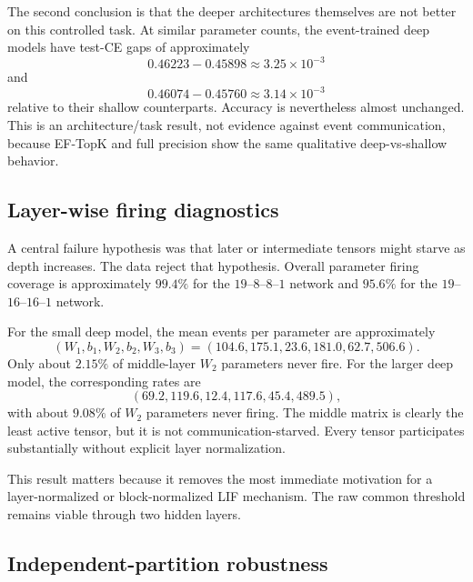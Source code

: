 The second conclusion is that the deeper architectures themselves are not better on this controlled task. At similar parameter counts, the event-trained deep models have test-CE gaps of approximately
\begin{equation}
 0.46223-0.45898\approx3.25\times10^{-3}
\end{equation}
and
\begin{equation}
 0.46074-0.45760\approx3.14\times10^{-3}
\end{equation}
relative to their shallow counterparts. Accuracy is nevertheless almost unchanged. This is an architecture/task result, not evidence against event communication, because EF-TopK and full precision show the same qualitative deep-vs-shallow behavior.

\subsection{Layer-wise firing diagnostics}

A central failure hypothesis was that later or intermediate tensors might starve as depth increases. The data reject that hypothesis. Overall parameter firing coverage is approximately $99.4\%$ for the $19$--$8$--$8$--$1$ network and $95.6\%$ for the $19$--$16$--$16$--$1$ network.

For the small deep model, the mean events per parameter are approximately
\begin{equation}
 (W_1,b_1,W_2,b_2,W_3,b_3)
 =
 (104.6,175.1,23.6,181.0,62.7,506.6).
\end{equation}
Only about $2.15\%$ of middle-layer $W_2$ parameters never fire. For the larger deep model, the corresponding rates are
\begin{equation}
 (69.2,119.6,12.4,117.6,45.4,489.5),
\end{equation}
with about $9.08\%$ of $W_2$ parameters never firing. The middle matrix is clearly the least active tensor, but it is not communication-starved. Every tensor participates substantially without explicit layer normalization.

This result matters because it removes the most immediate motivation for a layer-normalized or block-normalized LIF mechanism. The raw common threshold remains viable through two hidden layers.

\subsection{Independent-partition robustness}

